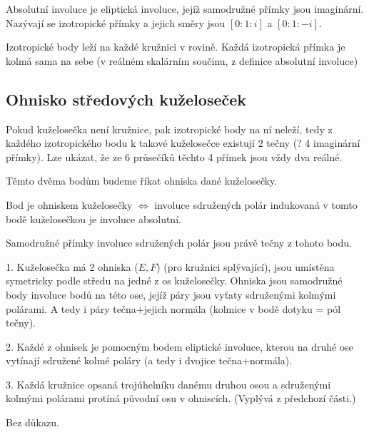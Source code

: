 \documentclass[12pt]{article}					%
\begin{document}
\begin{poznamka}[Platí]
	Absolutní involuce je eliptická involuce, jejíž samodružné přímky jsou imaginární. Nazývají se izotropické přímky a jejich směry jsou $[0:1:i]$ a $[0:1:-i]$.
\end{poznamka}

\begin{poznamka}
	Izotropické body leží na každé kružnici v rovině. Každá izotropická přímka je kolmá sama na sebe (v reálném skalárním součinu, z definice absolutní involuce)
\end{poznamka}

\subsection{Ohnisko středových kuželoseček}
\begin{dusledek}
	Pokud kuželosečka není kružnice, pak izotropické body na ní neleží, tedy z každého izotropického bodu k takové kuželosečce existují 2 tečny (? 4 imaginární přímky). Lze ukázat, že ze 6 průsečíků těchto 4 přímek jsou vždy dva reálné.
\end{dusledek}

\begin{definice}[Ohnisko]
	Těmto dvěma bodům budeme říkat ohniska dané kuželosečky.
\end{definice}

\begin{veta}
	Bod je ohniskem kuželosečky $\Leftrightarrow$ involuce sdružených polár indukovaná v tomto bodě kuželosečkou je involuce absolutní.

	\begin{dukazin}
		Samodružné přímky involuce sdružených polár jsou právě tečny z tohoto bodu.
	\end{dukazin}
\end{veta}

\begin{veta}
	1. Kuželosečka má 2 ohniska ($E, F$) (pro kružnici splývající), jsou umístěna symetricky podle středu na jedné z os kuželosečky. Ohniska jsou samodružné body involuce bodů na této ose, jejíž páry jsou vyťaty sdruženými kolmými polárami. A tedy i páry tečna+jejich normála (kolmice v bodě dotyku = pól tečny).

	2. Každé z ohnisek je pomocným bodem eliptické involuce, kterou na druhé ose vytínají sdružené kolmé poláry (a tedy i dvojice tečna+normála).

	3. Každá kružnice opsaná trojúhelníku danému druhou osou a sdruženými kolmými polárami protíná původní osu v ohniscích. (Vyplývá z předchozí části.)

	\begin{dukazin}
		Bez důkazu.
	\end{dukazin}
\end{veta}
\end{document}
